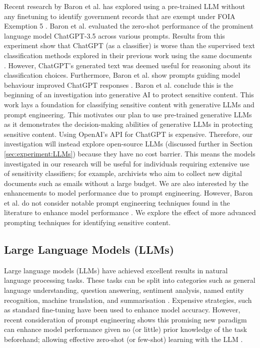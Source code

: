 Recent research by Baron et al. has explored using a pre-trained LLM without any finetuning to identify government records that are exempt under FOIA Exemption 5 \cite{baron2023using}. Baron et al. evaluated the zero-shot performance of the prominent language model ChatGPT-3.5 \cite{brown2020language} across various prompts. Results from this experiment show that ChatGPT (as a classifier) is worse than the supervised text classification methods explored in their previous work using the same documents \cite{baron2022providing}. However, ChatGPT’s generated text was deemed useful for reasoning about its classification choices. Furthermore, Baron et al. show prompts guiding model behaviour improved ChatGPT responses \cite{baron2023using}. Baron et al. conclude this is the beginning of an investigation into generative AI to protect sensitive content. This work lays a foundation for classifying sensitive content with generative LLMs and prompt engineering. This motivates our plan to use pre-trained generative LLMs as it demonstrates the decision-making abilities of generative LLMs in protecting sensitive content. Using OpenAI’s API for ChatGPT is expensive. Therefore, our investigation will instead explore open-source LLMs (discussed further in Section \ref{sec:experiment:LLMs}) because they have no cost barrier. This means the models investigated in our research will be useful for individuals requiring extensive use of sensitivity classifiers; for example, archivists who aim to collect new digital documents such as emails without a large budget. We are also interested by the enhancements to model performance due to prompt engineering. However, Baron et al. do not consider notable prompt engineering techniques found in the literature to enhance model performance \cite{white2023prompt}. We explore the effect of more advanced prompting techniques for identifying sensitive content.

\subsection{Large Language Models (LLMs)}
Large language models (LLMs) have achieved excellent results in natural language processing tasks. These tasks can be split into categories such as general language understanding, question answering, sentiment analysis, named entity recognition, machine translation, and summarisation \cite{qiu2020pre}. Expensive strategies, such as standard fine-tuning have been used to enhance model accuracy. However, recent consideration of prompt engineering shows this promising new paradigm can enhance model performance given no (or little) prior knowledge of the task beforehand; allowing effective zero-shot (or few-shot) learning with the LLM \cite{liu2023pre}.

